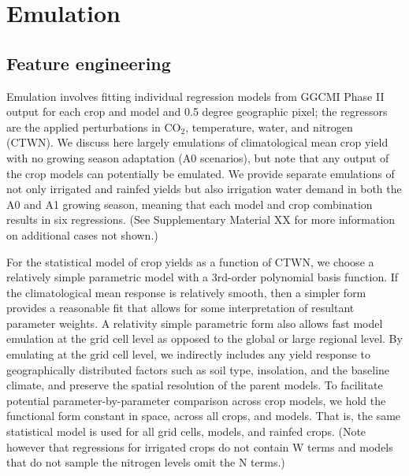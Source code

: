 \documentclass[gmd, manuscript]{copernicus} %
\begin{document}
\section{Emulation}
\label{S:3}
\subsection{Feature engineering}
Emulation involves fitting individual regression models from GGCMI Phase II output for each crop and model and 0.5 degree geographic pixel; the regressors are the applied perturbations in CO$_2$, temperature, water, and nitrogen (CTWN). 
We discuss here largely emulations of climatological mean crop yield with no growing season adaptation (A0 scenarios), but note that any output of the crop models can potentially be emulated. 
We provide separate emulations of not only irrigated and rainfed yields but also irrigation water demand in both the A0 and A1 growing season, meaning that each model and crop combination results in six regressions. (See Supplementary Material XX for more information on additional cases not shown.)

For the statistical model of crop yields as a function of CTWN, we choose a relatively simple parametric model with a 3rd-order polynomial basis function. 
If the climatological mean response is relatively smooth, then a simpler form provides a reasonable fit that allows for some interpretation of resultant parameter weights. 
A relativity simple parametric form also allows fast model emulation at the grid cell level as opposed to the global or large regional level. 
By emulating at the grid cell level, we indirectly includes any yield response to geographically distributed factors such as soil type, insolation, and the baseline climate, and preserve the spatial resolution of the parent models.
To facilitate potential parameter-by-parameter comparison across crop models, we hold the functional form constant in space, across all crops, and models. 
That is, the same statistical model is used for all grid cells, models, and rainfed crops. 
(Note however that regressions for irrigated crops do not contain W terms and models that do not sample the nitrogen levels omit the N terms.)
\end{document}
